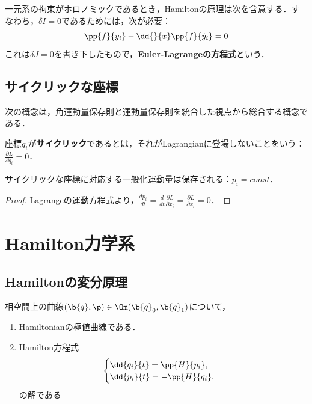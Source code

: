 \documentclass[uplatex,dvipdfmx]{jsreport}
\begin{document}
\begin{proposition}[Hamiltonの原理の必要条件]
    一元系の拘束がホロノミックであるとき，Hamiltonの原理は次を含意する．すなわち，$\delta I=0$であるためには，次が必要：
    \[\pp{f}{y_i}-\dd{}{x}\pp{f}{\dot{y}_i}=0\]
    これは$\delta J=0$を書き下したもので，\textbf{Euler-Lagrangeの方程式}という．
\end{proposition}


\subsection{サイクリックな座標}


次の概念は，角運動量保存則と運動量保存則を統合した視点から総合する概念である．

\begin{definition}
    座標$q_i$が\textbf{サイクリック}であるとは，それがLagrangianに登場しないことをいう：$\frac{\partial L}{\partial\dot{q}_i}=0$．
\end{definition}
\begin{theorem}
    サイクリックな座標に対応する一般化運動量は保存される：$p_i=const$．
\end{theorem}
\begin{proof}
    Lagrangeの運動方程式より，$\frac{dp_i}{dt}=\frac{d}{dt}\frac{\partial L}{\partial \dot{x}_i}=\frac{\partial L}{\partial x_i}=0$．
\end{proof}

\section{Hamilton力学系}

\subsection{Hamiltonの変分原理}

\begin{theorem}
    相空間上の曲線$(\b{q},\p)\in\Om(\b{q}_0,\b{q}_1)$について，
    \begin{enumerate}
        \item Hamiltonianの極値曲線である．
        \item Hamilton方程式
        \[\begin{cases}
            \dd{q_i}{t}=\pp{H}{p_i},\\
            \dd{p_i}{t}=-\pp{H}{q_i}.
        \end{cases}\]
        の解である
    \end{enumerate}
\end{theorem}
\end{document}

